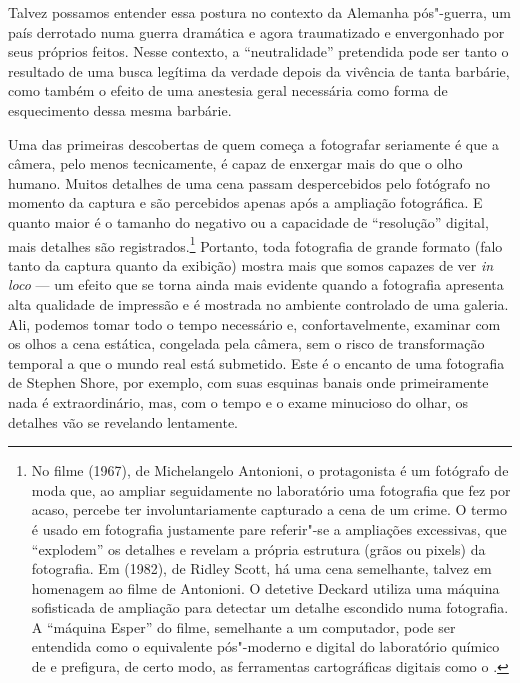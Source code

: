 Talvez possamos entender essa postura no contexto da Alemanha
pós"-guerra, um país derrotado numa guerra dramática e agora traumatizado
e envergonhado por seus próprios feitos. Nesse contexto, a
``neutralidade'' pretendida pode ser tanto o resultado de uma busca
legítima da verdade depois da vivência de tanta barbárie, como também o
efeito de uma anestesia geral necessária como forma de esquecimento
dessa mesma barbárie.

Uma das primeiras descobertas de quem começa a fotografar seriamente é
que a câmera, pelo menos tecnicamente, é capaz de enxergar mais do que o
olho humano. Muitos detalhes de uma cena passam despercebidos pelo
fotógrafo no momento da captura e são percebidos apenas após a ampliação
fotográfica. E quanto maior é o tamanho do negativo ou a capacidade de
``resolução'' digital, mais detalhes são registrados.\footnote{No filme
  {} (1967), de Michelangelo Antonioni, o protagonista é um
  fotógrafo de moda que, ao ampliar seguidamente no laboratório uma
  fotografia que fez por acaso, percebe ter involuntariamente capturado
  a cena de um crime. O termo {} é usado em fotografia
  justamente pare referir"-se a ampliações excessivas, que ``explodem''
  os detalhes e revelam a própria estrutura (grãos ou pixels) da
  fotografia. Em {} (1982), de Ridley Scott, há uma
  cena semelhante, talvez em homenagem ao filme de Antonioni. O detetive
  Deckard utiliza uma máquina sofisticada de ampliação para detectar um
  detalhe escondido numa fotografia. A ``máquina Esper'' do filme,
  semelhante a um computador, pode ser entendida como o equivalente
  pós"-moderno e digital do laboratório químico de {} e
  prefigura, de certo modo, as ferramentas cartográficas digitais como o
  {}.} Portanto, toda fotografia de grande formato
(falo tanto da captura quanto da exibição) mostra mais que somos capazes
de ver \emph{in loco} --- um efeito que se torna ainda mais evidente
quando a fotografia apresenta alta qualidade de impressão e é mostrada
no ambiente controlado de uma galeria. Ali, podemos tomar todo o tempo
necessário e, confortavelmente, examinar com os olhos a cena estática,
congelada pela câmera, sem o risco de transformação temporal a que o
mundo real está submetido. Este é o encanto de uma fotografia de Stephen
Shore, por exemplo, com suas esquinas banais onde primeiramente nada é
extraordinário, mas, com o tempo e o exame minucioso do olhar, os
detalhes vão se revelando lentamente.


